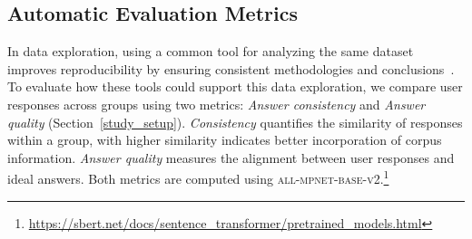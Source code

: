 
\subsection{Automatic Evaluation Metrics}
In data exploration, using a common tool for analyzing the same dataset improves reproducibility by ensuring consistent methodologies and conclusions~\cite{NationalAcademies2019}.
%
%
To evaluate how these tools could support this data exploration, we compare user responses across groups using two metrics: \textit{Answer consistency} and \textit{Answer quality} (Section~\ref{study_setup}).
%
\textit{Consistency} quantifies the similarity of responses within a group, with higher similarity indicates better incorporation of corpus information.
%
\textit{Answer quality} measures the alignment between user responses and ideal answers.
%
Both metrics are computed using \textsc{all-mpnet-base-v2}.\footnote{\url{https://sbert.net/docs/sentence_transformer/pretrained_models.html}}
%

